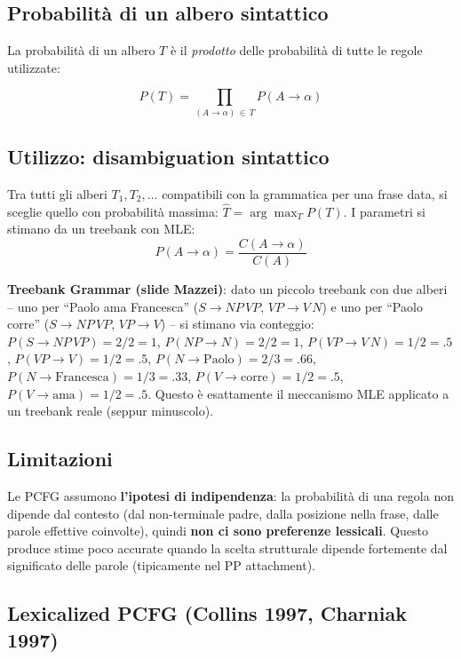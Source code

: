 \documentclass[12pt,a4paper]{article}
\begin{document}
\subsection{Probabilità di un albero sintattico}

La probabilità di un albero $T$ è il \emph{prodotto} delle probabilità di tutte le regole utilizzate:

\begin{formulabox}
\[
P(T) = \prod_{(A \to \alpha)\,\in\, T} P(A \to \alpha)
\]
\end{formulabox}

\subsection{Utilizzo: disambiguation sintattico}

Tra tutti gli alberi $T_1,T_2,\dots$ compatibili con la grammatica per una frase data, si sceglie quello con probabilità massima: $\hat{T} = \arg\max_T P(T)$. I parametri si stimano da un treebank con MLE:
\[
P(A \to \alpha) = \frac{C(A \to \alpha)}{C(A)}
\]

\begin{esempiobox}
\textbf{Treebank Grammar (slide Mazzei)}: dato un piccolo treebank con due alberi -- uno per ``Paolo ama Francesca'' ($S\to NP\,VP$, $VP \to V\,N$) e uno per ``Paolo corre'' ($S \to NP\,VP$, $VP \to V$) -- si stimano via conteggio: $P(S\to NP\,VP)= 2/2=1$, $P(NP\to N)=2/2=1$, $P(VP\to V\,N)=1/2=.5$, $P(VP\to V)=1/2=.5$, $P(N\to\text{Paolo})=2/3=.66$, $P(N\to\text{Francesca})=1/3=.33$, $P(V\to\text{corre})=1/2=.5$, $P(V\to\text{ama})=1/2=.5$. Questo è esattamente il meccanismo MLE applicato a un treebank reale (seppur minuscolo).
\end{esempiobox}

\subsection{Limitazioni}

Le PCFG assumono \textbf{l'ipotesi di indipendenza}: la probabilità di una regola non dipende dal contesto (dal non-terminale padre, dalla posizione nella frase, dalle parole effettive coinvolte), quindi \textbf{non ci sono preferenze lessicali}. Questo produce stime poco accurate quando la scelta strutturale dipende fortemente dal significato delle parole (tipicamente nel PP attachment).

\subsection{Lexicalized PCFG (Collins 1997, Charniak 1997)}
\end{document}
